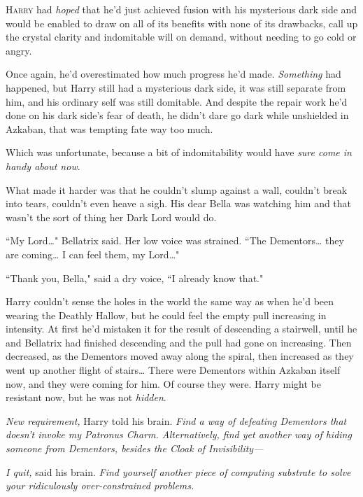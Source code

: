 
\lettrine{H}{arry} had \emph{hoped} that he'd just achieved fusion with his mysterious dark side and would be enabled to draw on all of its benefits with none of its drawbacks, call up the crystal clarity and indomitable will on demand, without needing to go cold or angry.

Once again, he'd overestimated how much progress he'd made. \emph{Something} had happened, but Harry still had a mysterious dark side, it was still separate from him, and his ordinary self was still domitable. And despite the repair work he'd done on his dark side's fear of death, he didn't dare go dark while unshielded in Azkaban, that was tempting fate way too much.

Which was unfortunate, because a bit of indomitability would have \emph{sure come in handy about now}.

What made it harder was that he couldn't slump against a wall, couldn't break into tears, couldn't even heave a sigh. His dear Bella was watching him and that wasn't the sort of thing her Dark Lord would do.

``My Lord{\ldots}" Bellatrix said. Her low voice was strained. ``The Dementors{\ldots} they are coming{\ldots} I can feel them, my Lord{\ldots}"

``Thank you, Bella," said a dry voice, ``I already know that."

Harry couldn't sense the holes in the world the same way as when he'd been wearing the Deathly Hallow, but he could feel the empty pull increasing in intensity. At first he'd mistaken it for the result of descending a stairwell, until he and Bellatrix had finished descending and the pull had gone on increasing. Then decreased, as the Dementors moved away along the spiral, then increased as they went up another flight of stairs{\ldots} There were Dementors within Azkaban itself now, and they were coming for him. Of course they were. Harry might be resistant now, but he was not \emph{hidden}.

\emph{New requirement,} Harry told his brain. \emph{Find a way of defeating Dementors that doesn't invoke my Patronus Charm. Alternatively, find yet another way of hiding someone from Dementors, besides the Cloak of Invisibility---}

\emph{I quit,} said his brain. \emph{Find yourself another piece of computing substrate to solve your ridiculously over-constrained problems.}

